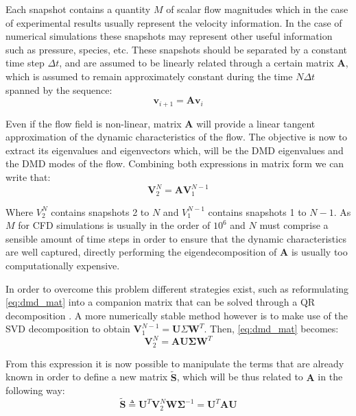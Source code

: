 Each snapshot contains a quantity $M$ of scalar flow magnitudes which in the case of experimental results usually represent the velocity information. In the case of numerical simulations these snapshots may represent other useful information such as pressure, species, etc. These snapshots should be separated by a constant time step $\Delta t$, and are assumed to be linearly related through a certain matrix $\mathbf A$, which is assumed to remain approximately constant during the time $N\Delta t$ spanned by the sequence:
\begin{equation}\label{eq:dmd_linear}
	\mathbf v_{i+1} = \mathbf A \mathbf v_i
\end{equation}

Even if the flow field is non-linear, matrix $\mathbf A$ will provide a linear tangent approximation of the dynamic characteristics of the flow. The objective is now to extract its eigenvalues and eigenvectors which, will be the DMD eigenvalues and the DMD modes of the flow. Combining both expressions in matrix form we can write that:
\begin{equation}\label{eq:dmd_mat}
	 \mathbf V_{2}^{N}=\mathbf A \mathbf V_{1}^{N-1}
\end{equation}

Where $V_{2}^{N}$ contains snapshots 2 to $N$ and $V_{1}^{N-1}$ contains snapshots 1 to $N-1$. As $M$ for CFD simulations is usually in the order of $10^6$ and $N$ must comprise a sensible amount of time steps in order to ensure that the dynamic characteristics are well captured, directly performing the eigendecomposition of $\mathbf A$ is usually too computationally expensive.

In order to overcome this problem different strategies exist, such as reformulating \ref{eq:dmd_mat} into a companion matrix that can be solved through a QR decomposition \cite{schmid2011applications,rowley2009spectral,bagheri2013koopman}. A more numerically stable method however is to make use of the SVD decomposition \cite{schmid2010dynamic,jovanovic2014sparsity,sakowitz2014flow,chen2012variants} to obtain $\mathbf V_1^{N-1} = \mathbf U \Sigma\mathbf W^T$. Then, \ref{eq:dmd_mat} becomes:
\begin{equation}
	\mathbf V_2^N = \mathbf A \mathbf U \bm\Sigma \mathbf W^T
\end{equation}

From this expression it is now possible to manipulate the terms that are already known in order to define a new matrix $\widetilde{\mathbf{S}}$, which will be thus related to $\mathbf A$ in the following way:
\begin{equation}
	\widetilde{\mathbf{S}} \triangleq \mathbf U^T \mathbf V_2^N \mathbf W \bm\Sigma^{-1} = \mathbf U^T \mathbf A \mathbf U
\end{equation}

